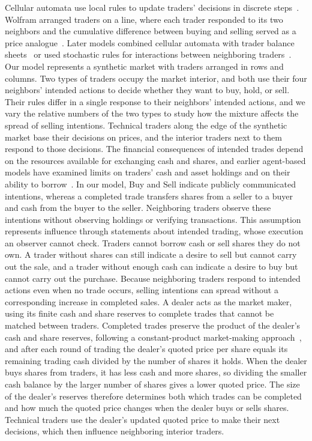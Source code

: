 Cellular automata use local rules to update traders' decisions in
discrete steps~\cite{wolfram1984universality,packard1985two}. Wolfram
arranged traders on a line, where each trader responded to its two
neighbors and the cumulative difference between buying and selling
served as a price analogue~\cite{wolfram2002new}. Later models combined
cellular automata with trader balance sheets~\cite{valsan2022on} or used
stochastic rules for interactions between neighboring
traders~\cite{wei2003cellular,bartolozzi2004stochastic,qiu2007cellular,fan2009effect,atman2012influence}.
Our model represents a synthetic market with traders arranged in rows
and columns. Two types of traders occupy the market interior, and both
use their four neighbors' intended actions to decide whether they want
to buy, hold, or sell. Their rules differ in a single response to their
neighbors' intended actions, and we vary the relative numbers of the two
types to study how the mixture affects the spread of selling intentions.
Technical traders along the edge of the synthetic market base their
decisions on prices, and the interior traders next to them respond to
those decisions. The financial consequences of intended trades depend on
the resources available for exchanging cash and shares, and earlier
agent-based models have examined limits on traders' cash and asset
holdings and on their ability to
borrow~\cite{raberto2001agent,thurner2012leverage}. In our model, Buy and
Sell indicate publicly communicated intentions, whereas a completed trade transfers
shares from a seller to a buyer and cash from the buyer to the seller.
Neighboring traders observe these intentions without observing holdings
or verifying transactions. This assumption represents influence through
statements about intended trading, whose execution an observer cannot
check.
Traders cannot borrow cash or sell shares they do not own. A trader
without shares can still indicate a desire to sell but cannot carry out
the sale, and a trader without enough cash can indicate a desire to buy
but cannot carry out the purchase. Because neighboring traders respond
to intended actions even when no trade occurs, selling intentions can
spread without a corresponding increase in completed sales. A dealer
acts as the market maker, using its finite cash and share reserves to
complete trades that cannot be matched between traders. Completed trades
preserve the product of the dealer's cash and share reserves, following
a constant-product market-making approach~\cite{angeris2022constant}, and
after each round of trading the dealer's quoted price per share equals
its remaining trading cash divided by the number of shares it holds.
When the dealer buys shares from traders, it has less cash and more
shares, so dividing the smaller cash balance by the larger number of
shares gives a lower quoted price. The size of the dealer's reserves
therefore determines both which trades can be completed and how much the
quoted price changes when the dealer buys or sells shares. Technical
traders use the dealer's updated quoted price to make their next
decisions, which then influence neighboring interior traders.

